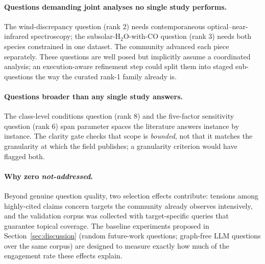 \paragraph{Questions demanding joint analyses no single study performs.}
The wind-discrepancy question (rank 2) needs contemporaneous
optical--near-infrared spectroscopy; the subsolar-H$_2$O-with-CO
question (rank 3) needs both species constrained in one dataset. The
community advanced each piece separately. These questions are well
posed but implicitly assume a coordinated analysis; an execution-aware
refinement step could split them into staged sub-questions the way the
curated rank-1 family already is.

\paragraph{Questions broader than any single study answers.}
The class-level conditions question (rank 8) and the five-factor
sensitivity question (rank 6) span parameter spaces the literature
answers instance by instance. The clarity gate checks that scope is
\emph{bounded}, not that it matches the granularity at which the field
publishes; a granularity criterion would have flagged both.

\paragraph{Why zero \emph{not-addressed}.}
Beyond genuine question quality, two selection effects contribute:
tensions among highly-cited claims concern targets the community
already observes intensively, and the validation corpus was collected
with target-specific queries that guarantee topical coverage. The
baseline experiments proposed in Section~\ref{sec:discussion} (random
future-work questions; graph-free LLM questions over the same corpus)
are designed to measure exactly how much of the engagement rate these
effects explain.

